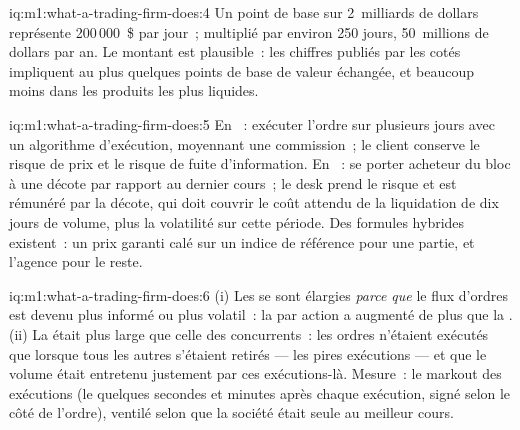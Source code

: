 \begin{solution}{iq:m1:what-a-trading-firm-does:4}
Un point de base sur 2~milliards de dollars représente 200\,000~\$ par jour~; multiplié par environ 250 jours,
50~millions de dollars par an. Le montant est plausible~: les chiffres publiés par les 
cotés impliquent au plus quelques points de base de valeur échangée, et beaucoup moins dans
les produits les plus liquides.
\end{solution}

\begin{solution}{iq:m1:what-a-trading-firm-does:5}
En ~: exécuter l'ordre sur plusieurs jours avec un algorithme d'exécution, moyennant
une commission~; le client conserve le risque de prix et le risque de fuite
d'information. En ~: se porter acheteur du bloc à une décote par rapport au dernier cours~; le
desk prend le risque et est rémunéré par la décote, qui doit couvrir le
coût attendu de la liquidation de dix jours de volume, plus la volatilité sur
cette période. Des formules hybrides existent~: un prix garanti calé sur un indice de référence pour une partie, et
l'agence pour le reste.
\end{solution}

\begin{solution}{iq:m1:what-a-trading-firm-does:6}
(i) Les  se sont élargies \emph{parce que} le flux d'ordres est devenu plus informé ou plus
volatil~: la  par action a augmenté de plus que la .
(ii) La  était plus large que celle des concurrents~: les ordres n'étaient exécutés
que lorsque tous les autres s'étaient retirés --- les pires exécutions --- et que le volume était
entretenu justement par ces exécutions-là. Mesure~: le markout des exécutions (le  quelques
secondes et minutes après chaque exécution, signé selon le côté de l'ordre), ventilé selon que la
société était seule au meilleur cours.
\end{solution}

